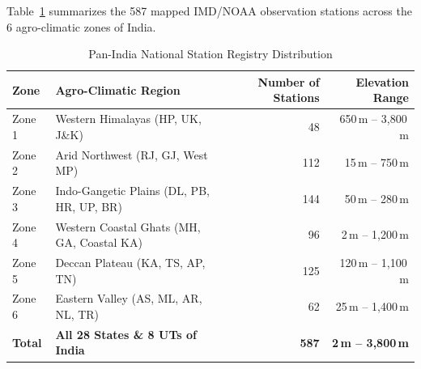 \documentclass[journal,a4paper]{IEEEtran}
\begin{document}
Table~\ref{tab:station_registry_summary} summarizes the 587 mapped IMD/NOAA observation stations across the 6 agro-climatic zones of India.

\begin{table}[!htbp]
\caption{Pan-India National Station Registry Distribution}
\label{tab:station_registry_summary}
\centering
\footnotesize
\begin{tabular}{@{}llrr@{}}
\toprule
Zone & Agro-Climatic Region & Number of Stations & Elevation Range \\
\midrule
Zone 1 & Western Himalayas (HP, UK, J\&K) & 48  & 650\,m -- 3{,}800\,m \\
Zone 2 & Arid Northwest (RJ, GJ, West MP) & 112 & 15\,m -- 750\,m \\
Zone 3 & Indo-Gangetic Plains (DL, PB, HR, UP, BR) & 144 & 50\,m -- 280\,m \\
Zone 4 & Western Coastal Ghats (MH, GA, Coastal KA) & 96 & 2\,m -- 1{,}200\,m \\
Zone 5 & Deccan Plateau (KA, TS, AP, TN) & 125 & 120\,m -- 1{,}100\,m \\
Zone 6 & Eastern Valley (AS, ML, AR, NL, TR) & 62 & 25\,m -- 1{,}400\,m \\
\midrule
\textbf{Total} & \textbf{All 28 States \& 8 UTs of India} & \textbf{587} & \textbf{2\,m -- 3{,}800\,m} \\
\bottomrule
\end{tabular}
\end{table}
\end{document}
